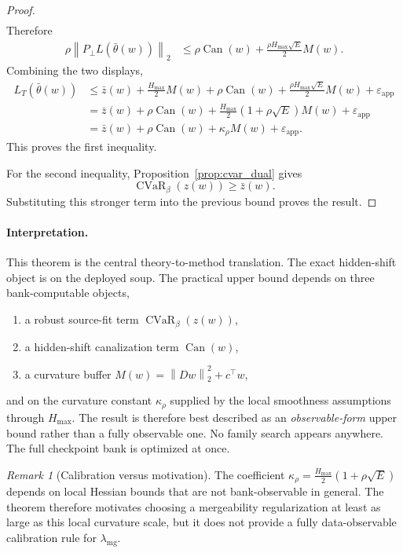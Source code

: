 \documentclass[11pt]{article}
\newcommand{\1}{\mathbf{1}}
\newcommand{\cvar}{\operatorname{CVaR}}
\newcommand{\norm}[1]{\left\lVert #1 \right\rVert}
\newcommand{\Pperp}{P_\perp}
\theoremstyle{plain}
\theoremstyle{definition}
\theoremstyle{remark}
\newtheorem{remark}[theorem]{Remark}
\begin{document}
\begin{proof}
\begin{align*}
\end{align*}
Therefore
\begin{align*}
\rho\norm{\Pperp L(\bar\theta(w))}_2
&\le \rho\operatorname{Can}(w) + \frac{\rho H_{\max}\sqrt{E}}{2}M(w).
\end{align*}
Combining the two displays,
\begin{align*}
L_T(\bar\theta(w))
&\le \bar z(w) + \frac{H_{\max}}{2}M(w) + \rho\operatorname{Can}(w) + \frac{\rho H_{\max}\sqrt{E}}{2}M(w) + \varepsilon_{\mathrm{app}} \\
&= \bar z(w) + \rho\operatorname{Can}(w) + \frac{H_{\max}}{2}(1 + \rho\sqrt{E})M(w) + \varepsilon_{\mathrm{app}} \\
&= \bar z(w) + \rho\operatorname{Can}(w) + \kappa_{\rho} M(w) + \varepsilon_{\mathrm{app}}.
\end{align*}
This proves the first inequality.

For the second inequality, Proposition~\ref{prop:cvar_dual} gives
\[
\cvar_{\beta}(z(w)) \ge \bar z(w).
\]
Substituting this stronger term into the previous bound proves the result.
\end{proof}

\paragraph{Interpretation.}
This theorem is the central theory-to-method translation. The exact hidden-shift object is on the deployed soup. The practical upper bound depends on three bank-computable objects,
\begin{enumerate}[leftmargin=1.5em]
    \item a robust source-fit term $\cvar_{\beta}(z(w))$,
    \item a hidden-shift canalization term $\operatorname{Can}(w)$,
    \item a curvature buffer $M(w)=\norm{Dw}_2^2 + c^\top w$,
\end{enumerate}
and on the curvature constant $\kappa_{\rho}$ supplied by the local smoothness assumptions through $H_{\max}$. The result is therefore best described as an \emph{observable-form} upper bound rather than a fully observable one. No family search appears anywhere. The full checkpoint bank is optimized at once.

\begin{remark}[Calibration versus motivation]
The coefficient $\kappa_{\rho}=\frac{H_{\max}}{2}(1+\rho\sqrt{E})$ depends on local Hessian bounds that are not bank-observable in general. The theorem therefore motivates choosing a mergeability regularization at least as large as this local curvature scale, but it does not provide a fully data-observable calibration rule for $\lambda_{\mathrm{mg}}$.
\end{remark}
\end{document}
